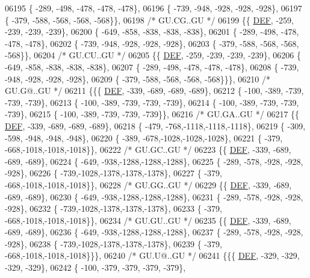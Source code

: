 \begin{DoxyCode}
06195 \{ -289, -498, -478, -478, -478\},
06196 \{ -739, -948, -928, -928, -928\},
06197 \{ -379, -588, -568, -568, -568\}\},
06198 \textcolor{comment}{/* GU.CG..GU */}
06199 \{\{  \mbox{\hyperlink{1_88_84__epars_8h_a397419fc12b37ed479c8abb9d444d843}{DEF}}, -259, -239, -239, -239\},
06200 \{ -649, -858, -838, -838, -838\},
06201 \{ -289, -498, -478, -478, -478\},
06202 \{ -739, -948, -928, -928, -928\},
06203 \{ -379, -588, -568, -568, -568\}\},
06204 \textcolor{comment}{/* GU.CU..GU */}
06205 \{\{  \mbox{\hyperlink{1_88_84__epars_8h_a397419fc12b37ed479c8abb9d444d843}{DEF}}, -259, -239, -239, -239\},
06206 \{ -649, -858, -838, -838, -838\},
06207 \{ -289, -498, -478, -478, -478\},
06208 \{ -739, -948, -928, -928, -928\},
06209 \{ -379, -588, -568, -568, -568\}\}\},
06210 \textcolor{comment}{/* GU.G@..GU */}
06211 \{\{\{  \mbox{\hyperlink{1_88_84__epars_8h_a397419fc12b37ed479c8abb9d444d843}{DEF}}, -339, -689, -689, -689\},
06212 \{ -100, -389, -739, -739, -739\},
06213 \{ -100, -389, -739, -739, -739\},
06214 \{ -100, -389, -739, -739, -739\},
06215 \{ -100, -389, -739, -739, -739\}\},
06216 \textcolor{comment}{/* GU.GA..GU */}
06217 \{\{  \mbox{\hyperlink{1_88_84__epars_8h_a397419fc12b37ed479c8abb9d444d843}{DEF}}, -339, -689, -689, -689\},
06218 \{ -479, -768,-1118,-1118,-1118\},
06219 \{ -309, -598, -948, -948, -948\},
06220 \{ -389, -678,-1028,-1028,-1028\},
06221 \{ -379, -668,-1018,-1018,-1018\}\},
06222 \textcolor{comment}{/* GU.GC..GU */}
06223 \{\{  \mbox{\hyperlink{1_88_84__epars_8h_a397419fc12b37ed479c8abb9d444d843}{DEF}}, -339, -689, -689, -689\},
06224 \{ -649, -938,-1288,-1288,-1288\},
06225 \{ -289, -578, -928, -928, -928\},
06226 \{ -739,-1028,-1378,-1378,-1378\},
06227 \{ -379, -668,-1018,-1018,-1018\}\},
06228 \textcolor{comment}{/* GU.GG..GU */}
06229 \{\{  \mbox{\hyperlink{1_88_84__epars_8h_a397419fc12b37ed479c8abb9d444d843}{DEF}}, -339, -689, -689, -689\},
06230 \{ -649, -938,-1288,-1288,-1288\},
06231 \{ -289, -578, -928, -928, -928\},
06232 \{ -739,-1028,-1378,-1378,-1378\},
06233 \{ -379, -668,-1018,-1018,-1018\}\},
06234 \textcolor{comment}{/* GU.GU..GU */}
06235 \{\{  \mbox{\hyperlink{1_88_84__epars_8h_a397419fc12b37ed479c8abb9d444d843}{DEF}}, -339, -689, -689, -689\},
06236 \{ -649, -938,-1288,-1288,-1288\},
06237 \{ -289, -578, -928, -928, -928\},
06238 \{ -739,-1028,-1378,-1378,-1378\},
06239 \{ -379, -668,-1018,-1018,-1018\}\}\},
06240 \textcolor{comment}{/* GU.U@..GU */}
06241 \{\{\{  \mbox{\hyperlink{1_88_84__epars_8h_a397419fc12b37ed479c8abb9d444d843}{DEF}}, -329, -329, -329, -329\},
06242 \{ -100, -379, -379, -379, -379\},

\end{DoxyCode}
